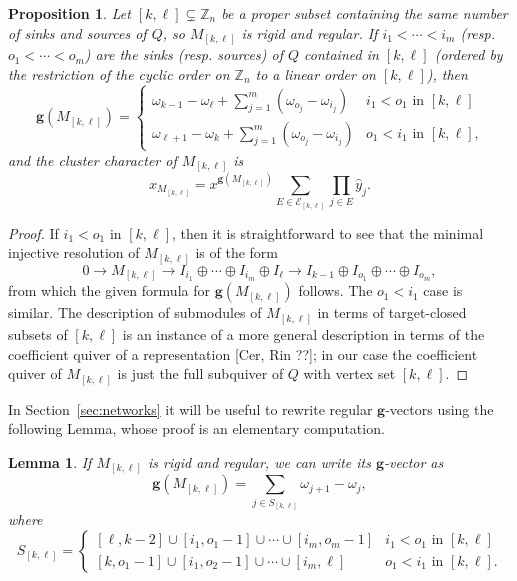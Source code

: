 \documentclass[12pt]{amsart}
\newcommand{\ZZ}{\mathbb{Z}}
\newcommand{\bfg}{\mathbf{g}}
\newcommand{\grep}{\bfg}
\newcommand{\cE}{\mathcal{E}}
\newcommand{\Qrep}{M}
\newtheorem{lemma}[theorem]{Lemma}
\newtheorem{proposition}[theorem]{Proposition}
\theoremstyle{remark}
\numberwithin{equation}{section}
\numberwithin{figure}{section}
\begin{document}
\begin{proposition}
  \label{prop:regular coindices}
  Let $[k,\ell] \subsetneq \ZZ_n$ be a proper subset containing the same number of sinks and sources of $Q$, so $\Qrep_{[k,\ell]}$ is rigid and regular.
  If $i_1 < \cdots < i_m$ (resp. $o_1 < \cdots < o_m$) are the sinks (resp. sources) of $Q$ contained in $[k,\ell]$ (ordered by the restriction of the cyclic order on $\ZZ_n$ to a linear order on $[k,\ell]$), then 
  \[
    \grep(\Qrep_{[k,\ell]}) 
    = 
    \begin{cases} 
      \omega_{k-1}-\omega_\ell+\sum_{j=1}^m (\omega_{o_j}-\omega_{i_j}) & \text{$i_1<o_1$ in $[k,\ell]$}\\ 
      \omega_{\ell+1}-\omega_k+\sum_{j=1}^m (\omega_{o_j}-\omega_{i_j}) & \text{$o_1 < i_1$ in $[k,\ell]$,}
    \end{cases}
  \]
  and the cluster character of $\Qrep_{[k,\ell]}$ is 
  \begin{equation}
    \label{eq:regular cluster characters}
    x_{\Qrep_{[k,\ell]}} 
    = 
    x^{\grep(\Qrep_{[k,\ell]})} \sum_{E \in \cE_{[k,\ell]}} \prod_{j \in E} \hat{y}_j.
  \end{equation}
\end{proposition}
\begin{proof}
  If $i_1 < o_1$ in $[k,\ell]$, then it is straightforward to see that the minimal injective resolution of $\Qrep_{[k,\ell]}$ is of the form
  \[
    0
    \to 
    \Qrep_{[k,\ell]} 
    \to 
    I_{i_1} \oplus \cdots \oplus I_{i_m}\oplus I_\ell 
    \to 
    I_{k-1} \oplus I_{o_1} \oplus \cdots \oplus I_{o_m},
  \] 
  from which the given formula for $\grep(\Qrep_{[k,\ell]})$ follows.
  The $o_1 < i_1$ case is similar.
  The description of submodules of $\Qrep_{[k,\ell]}$ in terms of target-closed subsets of $[k,\ell]$ is an instance of a more general description in terms of the coefficient quiver of a representation [Cer, Rin ??]; in our case the coefficient quiver of $\Qrep_{[k,\ell]}$ is just the full subquiver of $Q$ with vertex set $[k,\ell]$.
\end{proof}

In Section~\ref{sec:networks} it will be useful to rewrite regular $\bfg$-vectors using the following Lemma, whose proof is an elementary computation.

\begin{lemma}\label{lem:regulargvectors}
  If $\Qrep_{[k,\ell]}$ is rigid and regular, we can write its $\bfg$-vector as
  \[
    \grep(\Qrep_{[k,\ell]})=\sum_{j\in S_{[k,\ell]}} \omega_{j+1} - \omega_j,
  \]
  where 
  \[
    S_{[k,\ell]} 
    = 
    \begin{cases} 
      [\ell,k-2] \cup [i_1, o_1 -1] \cup \cdots \cup [i_m, o_m - 1] & \text{$i_1<o_1$ in $[k,\ell]$}\\ 
      [k,o_1-1] \cup [i_1,o_2-1] \cup \cdots \cup [i_m,\ell] & \text{$o_1 < i_1$ in $[k,\ell]$.}
    \end{cases}
  \]
\end{lemma}
\end{document}
